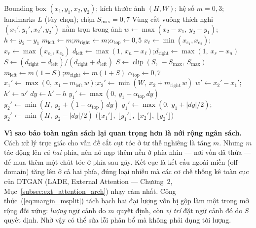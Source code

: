 \begin{algorithm}[H]
\caption{Adaptive Gaze-Dependent Margin Expansion (AGME)}
\label{alg:margin_expansion}
\begin{algorithmic}[1]
\Require Bounding box $(x_1, y_1, x_2, y_2)$; kích thước ảnh $(H, W)$; hệ số $m = 0{,}3$; landmarks $L$ (tùy chọn); chặn $S_{\max} = 0{,}7$
\Ensure Vùng cắt vuông thích nghi $(x_1', y_1', x_2', y_2')$ nằm trọn trong ảnh
\State $w \gets \max(x_2 - x_1,\ y_2 - y_1)$;\quad $h \gets y_2 - y_1$ 
\State $m_{\text{left}} \gets m$;\quad $m_{\text{right}} \gets m$;\quad $\alpha_{\text{top}} \gets 0{,}5$
 
    \State $x_\ell \gets \min(x_{e_1}, x_{e_2})$;\quad $x_r \gets \max(x_{e_1}, x_{e_2})$
    \State $d_{\text{left}} \gets \max(1,\ x_n - x_\ell)$;\quad $d_{\text{right}} \gets \max(1,\ x_r - x_n)$
    \State $S \gets (d_{\text{right}} - d_{\text{left}}) / (d_{\text{right}} + d_{\text{left}})$
    \State $S \gets \operatorname{clip}(S,\ -S_{\max},\ S_{\max})$
    \State $m_{\text{left}} \gets m(1 - S)$;\quad $m_{\text{right}} \gets m(1 + S)$ 
    \State $\alpha_{\text{top}} \gets 0{,}7$ 
\EndIf
\State $x_1' \gets \max(0,\ x_1 - m_{\text{left}}\,w)$;\quad $x_2' \gets \min(W,\ x_2 + m_{\text{right}}\,w)$
\State $w' \gets x_2' - x_1'$;\quad $h' \gets w'$ 
\State $dy \gets h' - h$ 
    \State $y_1' \gets \max(0,\ y_1 - \alpha_{\text{top}}\, dy)$
    \State $y_2' \gets \min(H,\ y_2 + (1 - \alpha_{\text{top}})\, dy)$
\Else
    \State $y_1' \gets \max(0,\ y_1 + |dy|/2)$;\quad $y_2' \gets \min(H,\ y_2 - |dy|/2)$
\EndIf
\State \Return $\big(\lfloor x_1' \rfloor,\ \lfloor y_1' \rfloor,\ \lfloor x_2' \rfloor,\ \lfloor y_2' \rfloor\big)$ 
\end{algorithmic}
\end{algorithm}

\textbf{Vì sao bảo toàn ngân sách lại quan trọng hơn là nới rộng ngân sách.} Cách xử lý trực giác cho vấn đề cắt cụt tóc ở tư thế nghiêng là tăng $m$. Nhưng $m$ tác động lên \textit{cả hai} phía, nên nó nạp thêm nền ở phía nhìn --- nơi vốn đã thừa --- để mua thêm một chút tóc ở phía sau gáy. Kết cục là kết cấu ngoài miền (off-domain) tăng lên ở cả hai phía, đúng loại nhiễu mà các cơ chế thống kê toàn cục của DTGAN (LADE, External Attention --- Chương~2, Mục~\ref{subsec:ext_attention_arch}) nhạy cảm nhất. Công thức~(\ref{eq:margin_msplit}) tách bạch hai đại lượng vốn bị gộp làm một trong mở rộng đối xứng: \textit{lượng} ngữ cảnh do $m$ quyết định, còn \textit{vị trí} đặt ngữ cảnh đó do $S$ quyết định. Nhờ vậy có thể sửa lỗi phân bổ mà không phải đụng tới lượng.

